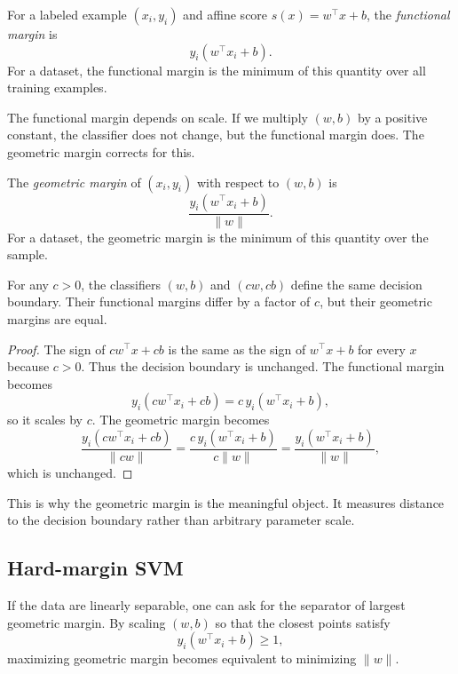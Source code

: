 \begin{definition}
For a labeled example $(x_i,y_i)$ and affine score $s(x)=w^\top x+b$, the \emph{functional margin} is
\[
y_i(w^\top x_i+b).
\]
For a dataset, the functional margin is the minimum of this quantity over all training examples.
\end{definition}

The functional margin depends on scale. If we multiply $(w,b)$ by a positive constant, the classifier does not change, but the functional margin does. The geometric margin corrects for this.

\begin{definition}
The \emph{geometric margin} of $(x_i,y_i)$ with respect to $(w,b)$ is
\[
\frac{y_i(w^\top x_i+b)}{\|w\|}.
\]
For a dataset, the geometric margin is the minimum of this quantity over the sample.
\end{definition}

\begin{proposition}
For any $c>0$, the classifiers $(w,b)$ and $(cw,cb)$ define the same decision boundary. Their functional margins differ by a factor of $c$, but their geometric margins are equal.
\end{proposition}

\begin{proof}
The sign of $cw^\top x+cb$ is the same as the sign of $w^\top x+b$ for every $x$ because $c>0$. Thus the decision boundary is unchanged. The functional margin becomes
\[
y_i(cw^\top x_i+cb)=c\,y_i(w^\top x_i+b),
\]
so it scales by $c$. The geometric margin becomes
\[
\frac{y_i(cw^\top x_i+cb)}{\|cw\|}
=
\frac{c\,y_i(w^\top x_i+b)}{c\|w\|}
=
\frac{y_i(w^\top x_i+b)}{\|w\|},
\]
which is unchanged.
\end{proof}

This is why the geometric margin is the meaningful object. It measures distance to the decision boundary rather than arbitrary parameter scale.

\subsection*{Hard-margin SVM}

If the data are linearly separable, one can ask for the separator of largest geometric margin. By scaling $(w,b)$ so that the closest points satisfy
\[
y_i(w^\top x_i+b)\ge 1,
\]
maximizing geometric margin becomes equivalent to minimizing $\|w\|$.

